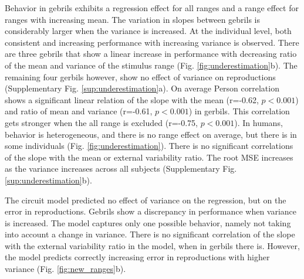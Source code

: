 \documentclass[10pt]{article}
\begin{document}
Behavior in gebrils exhibits a regression effect for all ranges and a range effect for ranges with increasing mean. 
The variation in slopes between gebrils is considerably larger when the variance is increased.
At the individual level, both consistent and increasing performance with increasing variance is observed. 
There are three gebrils that show a linear increase in performance with decreasing ratio of the mean and variance of the stimulus range (Fig. \ref{fig:underestimation}b). The remaining four gerbils however, show no effect of variance on reproductions (Supplementary Fig. \ref{sup:underestimation}a).
On average Person correlation shows a significant linear relation of the slope with the mean (r=-0.62, $p<0.001$) and ratio of mean and variance (r=-0.61, $p<0.001$) in gerbils.
This correlation gets stronger when the all range is excluded (r=-0.75, $p<0.001$).
In humans, behavior is heterogeneous, and there is no range effect on average, but there is in some individuals (Fig. \ref{fig:underestimation}). There is no significant correlations of the slope with the mean or external variability ratio.
The root MSE increases as the variance increases across all subjects (Supplementary Fig. \ref{sup:underestimation}b).

The circuit model predicted no effect of variance on the regression, but on the error in reproductions. 
Gebrils show a discrepancy in performance when variance is increased. 
The model captures only one possible behavior, namely not taking into account a change in variance. 
There is no significant correlation of the slope with the external variability ratio in the model, when in gerbils there is.
However, the model predicts correctly increasing error in reproductions with higher variance (Fig. \ref{fig:new_ranges}b).


\end{document}
